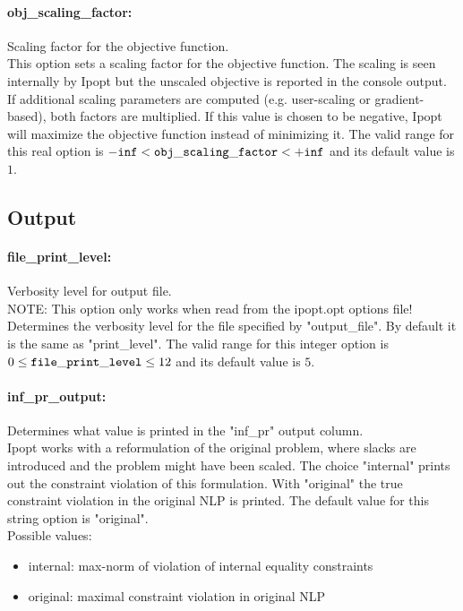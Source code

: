 \paragraph{obj\_scaling\_factor:}\label{opt:obj_scaling_factor} Scaling factor for the objective function. \\
 This option sets a scaling factor for the objective function. The scaling is seen internally by Ipopt but the unscaled objective is reported in the console output. If additional scaling parameters are computed (e.g. user-scaling or gradient-based), both factors are multiplied. If this value is chosen to be negative, Ipopt will maximize the objective function instead of minimizing it. The valid range for this real option is 
${\tt -inf} <  {\tt obj\_scaling\_factor } <  {\tt +inf}$
and its default value is $1$.


\subsection{Output}
\label{sec:Output}
\paragraph{file\_print\_level:}\label{opt:file_print_level} Verbosity level for output file. \\
 NOTE: This option only works when read from the ipopt.opt options file! Determines the verbosity level for the file specified by "output\_file".  By default it is the same as "print\_level". The valid range for this integer option is
$0 \le {\tt file\_print\_level } \le 12$
and its default value is $5$.


\paragraph{inf\_pr\_output:}\label{opt:inf_pr_output} Determines what value is printed in the "inf\_pr" output column. \\
 Ipopt works with a reformulation of the original problem, where slacks are introduced and the problem might have been scaled.  The choice "internal" prints out the constraint violation of this formulation. With "original" the true constraint violation in the original NLP is printed. The default value for this string option is "original".
\\ 
Possible values:
\begin{itemize}
   \item internal: max-norm of violation of internal equality constraints
   \item original: maximal constraint violation in original NLP
\end{itemize}

